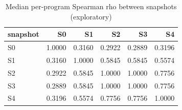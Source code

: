 \begin{table}[t]
\centering
\caption{Median per-program Spearman rho between snapshots (exploratory)}
\label{tab:v3-1-analysis-C-drift-matrix}
\begin{tabular}{lrrrrr}
\toprule
snapshot & S0 & S1 & S2 & S3 & S4 \\
\midrule
S0 & 1.0000 & 0.3160 & 0.2922 & 0.2889 & 0.3196 \\
S1 & 0.3160 & 1.0000 & 0.5845 & 0.5845 & 0.5574 \\
S2 & 0.2922 & 0.5845 & 1.0000 & 1.0000 & 0.7756 \\
S3 & 0.2889 & 0.5845 & 1.0000 & 1.0000 & 0.7756 \\
S4 & 0.3196 & 0.5574 & 0.7756 & 0.7756 & 1.0000 \\
\bottomrule
\end{tabular}
\end{table}
